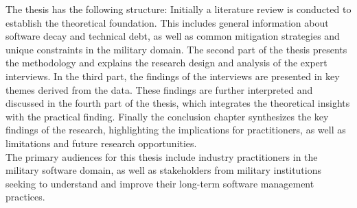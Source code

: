 The thesis has the following structure: Initially a literature review is conducted to establish the theoretical foundation. This includes general information about software decay and technical debt,
as well as common mitigation strategies and unique constraints in the military domain. The second part of the thesis presents the methodology and explains the research design and analysis of the expert interviews.
In the third part, the findings of the interviews are presented in key themes derived from the data. These findings are further interpreted and discussed in the fourth part of the thesis, which integrates the theoretical insights with the practical finding.
Finally the conclusion chapter synthesizes the key findings of the research, highlighting the implications for practitioners, as well as limitations and future research opportunities.\\

The primary audiences for this thesis include industry practitioners in the military software domain, as well as stakeholders from military institutions seeking to understand and improve their long-term software management practices.